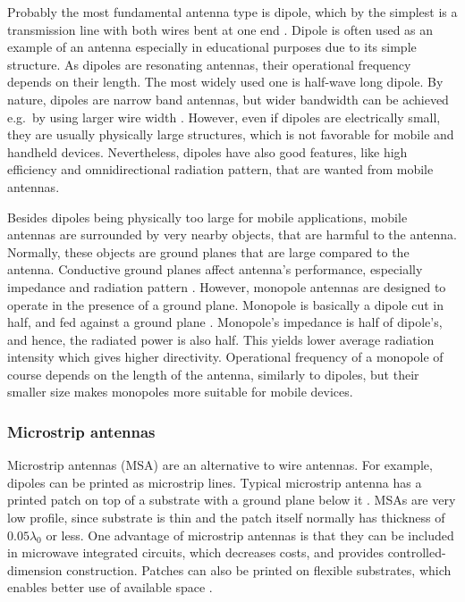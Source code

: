 Probably the most fundamental antenna type is dipole, which by the simplest is a transmission line with both wires bent at one end \cite{stutzman}. Dipole is often used as an example of an antenna especially in educational purposes due to its simple structure. As dipoles are resonating antennas, their operational frequency depends on their length. The most widely used one is half-wave long dipole.  By nature, dipoles are narrow band antennas, but wider bandwidth can be achieved e.g.\ by using larger wire width \cite{stutzman,balanis}. However, even if dipoles are electrically small, they are usually physically large structures, which is not favorable for mobile and handheld devices. Nevertheless, dipoles have also good features, like high efficiency and omnidirectional radiation pattern, that are wanted from mobile antennas.

Besides dipoles being physically too large for mobile applications, mobile antennas are surrounded by very nearby objects, that are harmful to the antenna. Normally, these objects are ground planes that are large compared to the antenna. Conductive ground planes affect antenna's performance, especially impedance and radiation pattern \cite{stutzman}. However, monopole antennas are designed to operate in the presence of a ground plane. Monopole is basically a dipole cut in half, and fed against a ground plane \cite{stutzman}. Monopole's impedance is half of dipole's, and hence, the radiated power is also half. This yields lower average radiation intensity which gives higher directivity. Operational frequency of a monopole of course depends on the length of the antenna, similarly to dipoles, but their smaller size makes monopoles more suitable for mobile devices.

\subsubsection{Microstrip antennas}
\label{sec:microstrip}

Microstrip antennas (MSA) are an alternative to wire antennas. For example, dipoles can be printed as microstrip lines. Typical microstrip antenna has a printed patch on top of a substrate with a ground plane below it \cite{stutzman}. MSAs are very low profile, since substrate is thin and the patch itself normally has thickness of $0.05\lambda_0$ or less. One advantage of microstrip antennas is that they can be included in microwave integrated circuits, which decreases costs, and provides controlled-dimension construction. Patches can also be printed on flexible substrates, which enables better use of available space \cite{stutzman}.

